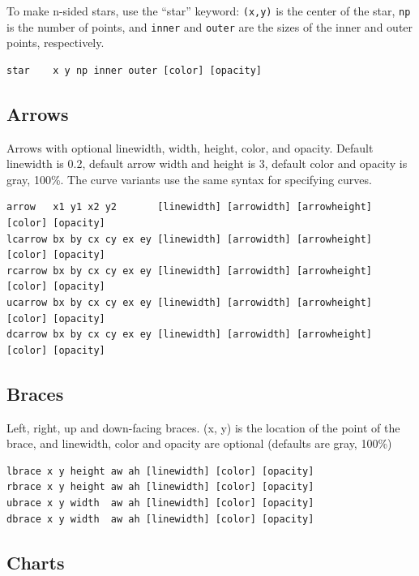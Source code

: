 To make n-sided stars, use the ``star'' keyword: \texttt{(x,y)} is the
center of the star, \texttt{np} is the number of points, and
\texttt{inner} and \texttt{outer} are the sizes of the inner and outer
points, respectively.

\begin{verbatim}
star    x y np inner outer [color] [opacity]
\end{verbatim}

\hypertarget{arrows}{%
\subsection{Arrows}\label{arrows}}

Arrows with optional linewidth, width, height, color, and opacity.
Default linewidth is 0.2, default arrow width and height is 3, default
color and opacity is gray, 100\%. The curve variants use the same syntax
for specifying curves.

\begin{verbatim}
arrow   x1 y1 x2 y2       [linewidth] [arrowidth] [arrowheight] [color] [opacity]
lcarrow bx by cx cy ex ey [linewidth] [arrowidth] [arrowheight] [color] [opacity]
rcarrow bx by cx cy ex ey [linewidth] [arrowidth] [arrowheight] [color] [opacity]
ucarrow bx by cx cy ex ey [linewidth] [arrowidth] [arrowheight] [color] [opacity]
dcarrow bx by cx cy ex ey [linewidth] [arrowidth] [arrowheight] [color] [opacity]
\end{verbatim}

\hypertarget{braces}{%
\subsection{Braces}\label{braces}}

Left, right, up and down-facing braces. (x, y) is the location of the
point of the brace, and linewidth, color and opacity are optional
(defaults are gray, 100\%)

\begin{verbatim}
lbrace x y height aw ah [linewidth] [color] [opacity]
rbrace x y height aw ah [linewidth] [color] [opacity]
ubrace x y width  aw ah [linewidth] [color] [opacity]
dbrace x y width  aw ah [linewidth] [color] [opacity]
\end{verbatim}

\hypertarget{charts}{%
\subsection{Charts}\label{charts}}

